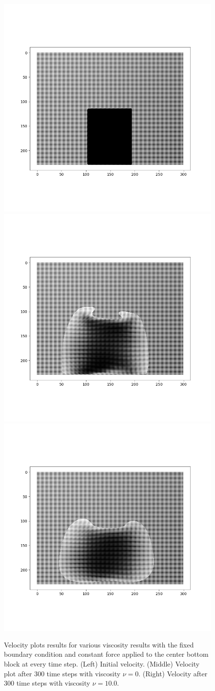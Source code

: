 \documentclass[sigconf]{acmart}
\begin{document}
\begin{figure}
    \centering
    \includegraphics[width=0.32\linewidth]{figs/panda_vis_init_vel.png}
    \includegraphics[width=0.32\linewidth]{figs/panda_vis0_vel.png}
    \includegraphics[width=0.32\linewidth]{figs/panda_vis10_vel.png}
    \caption{Velocity plots results for various viscosity results with the fixed boundary condition and constant force applied to the center bottom block at every time step. (Left) Initial velocity. (Middle) Velocity plot after 300 time steps with viscosity $\nu = 0$. (Right) Velocity after 300 time steps with viscosity $\nu = 10.0$.
    \label{fig:panda-vis-vel}}
\end{figure}
\end{document}

